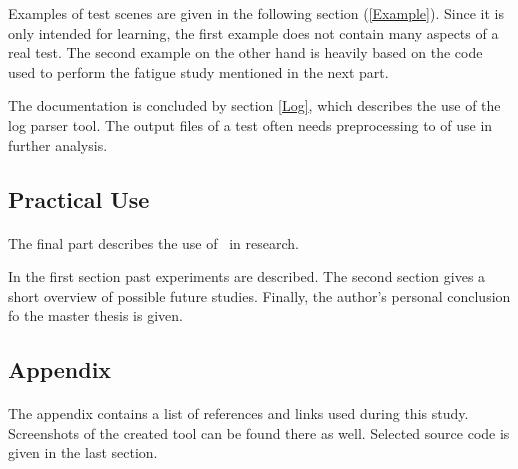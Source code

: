 Examples of test scenes are given in the following section (\ref{Example}).
Since it is only intended for learning, the first example does not contain many aspects of a real test.
The second example on the other hand is heavily based on the code used to perform the fatigue study mentioned in the next part.

The documentation is concluded by section \ref{Log}, which describes the use of the log parser tool.
The output files of a test often needs preprocessing to of use in further analysis.


\subsection{Practical Use}
\paragraph{}
The final part describes the use of \ER\ in research.

In the first section past experiments are described.
The second section gives a short overview of possible future studies.
Finally, the author's personal conclusion fo the master thesis is given.

\subsection{Appendix}
\paragraph{}
The appendix contains a list of references and links used during this study.
Screenshots of the created tool can be found there as well.
Selected source code is given in the last section.


